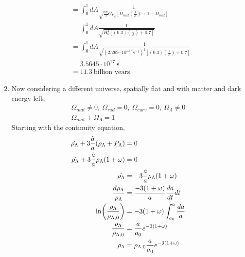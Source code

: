 \begin{enumerate}[label=(\alph*)]
\begin{align*}
	&= \int_0^{1}dA \frac{1}{\sqrt{\frac{8\pi}{3} G \rho_c \left[ \Omega_{mat} \left( \frac{1}{A}\right)  + 1 - \Omega_{mat} \right] }}  \\
	&= \int_0^{1}dA \frac{1}{\sqrt{ H_0^2 \left[ (0.3)\left( \frac{1}{A}\right)  + 0.7 \right] }}  \\
	&= \int_0^{1}dA \frac{1}{\sqrt{ (2.269 \cdot 10^{-18}s^{-1})^2 \left[ (0.3)\left( \frac{1}{A}\right)  + 0.7 \right] }}  \\
	&= 3.5645 \cdot 10^{17}\SI{}{\second} \\
	&= 11.3 \> \text{billion years}
\end{align*}
	\item  Now considering a different universe, spatially flat and with matter and dark energy left,
\begin{align}
\Omega_{mat} \ne 0, \> \Omega_{rad} = 0, \> \Omega_{curv} = 0, \> \Omega_{\Lambda} \ne 0 \\
\Omega_{mat} +\Omega_{\Lambda} = 1
\end{align}
Starting with the continuity equation,
\begin{align}
	\dot{\rho_{\Lambda}} + 3 \frac{\dot{a}}{a}(\rho_{\Lambda}+P_{\Lambda}) &= 0 \notag \\
	\dot{\rho_{\Lambda}} + 3 \frac{\dot{a}}{a} \rho_{\Lambda}(1+\omega) &= 0 \notag \\
	\dot{\rho_{\Lambda}} &= -3 \frac{\dot{a}}{a} \rho_{\Lambda} (1+\omega) \notag \\
	\frac{d\rho_{\Lambda}}{\rho_{\Lambda}} &= \frac{-3 (1+\omega)}{a}\frac{da}{dt} dt\notag \\ 
	\ln(\frac{\rho_{\Lambda}}{\rho_{\Lambda,0}}) &= -3 (1+\omega) \int^{a}_{a_0}\frac{da}{a}\notag \\
	\frac{\rho_{\Lambda}}{\rho_{\Lambda,0}} &= \frac{a}{a_0}e^{-3(1+\omega)}\notag \\
	\rho_{\Lambda} &= \rho_{\Lambda,0}\frac{a}{a_0}e^{-3(1+\omega)}

\end{align}
\end{enumerate}
